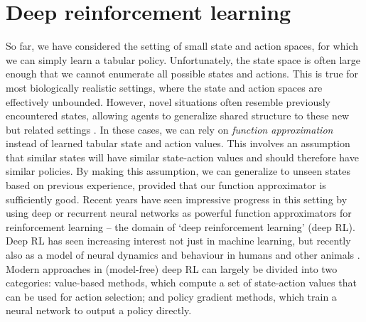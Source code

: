 \section{Deep reinforcement learning}
\label{sec:deep_RL}

So far, we have considered the setting of small state and action spaces, for which we can simply learn a tabular policy.
Unfortunately, the state space is often large enough that we cannot enumerate all possible states and actions.
This is true for most biologically realistic settings, where the state and action spaces are effectively unbounded.
However, novel situations often resemble previously encountered states, allowing agents to generalize shared structure to these new but related settings \citep{botvinick2020deep}.
In these cases, we can rely on \emph{function approximation} \citep{sutton2018reinforcement} instead of learned tabular state and action values.
This involves an assumption that similar states will have similar state-action values and should therefore have similar policies.
By making this assumption, we can generalize to unseen states based on previous experience, provided that our function approximator is sufficiently good.
Recent years have seen impressive progress in this setting by using deep or recurrent neural networks as powerful function approximators for reinforcement learning -- the domain of `deep reinforcement learning' (deep RL).
Deep RL has seen increasing interest not just in machine learning, but recently also as a model of neural dynamics and behaviour in humans and other animals \citep{wang2018prefrontal, jensen2023recurrent, makino2023arithmetic, merel2019deep, banino2018vector,aldarondo2024virtual,botvinick2020deep}.
Modern approaches in (model-free) deep RL can largely be divided into two categories: value-based methods, which compute a set of state-action values that can be used for action selection; and policy gradient methods, which train a neural network to output a policy directly.




